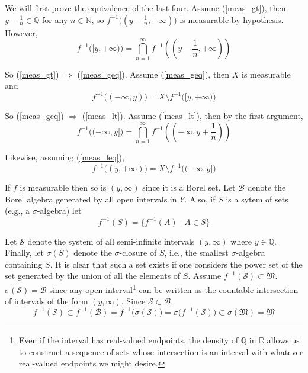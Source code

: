 \documentclass[11pt]{article}
\newcommand{\R}{\mathbb{R}}
\newcommand{\Q}{\mathbb{Q}}
\newcommand{\N}{\mathbb{N}}
\begin{document}
\begin{enumerate}
We will first prove the equivalence of the last four.  Assume (\ref{meas_gt}), then $y - \frac{1}{n} \in \Q$ for any $n \in \N$, so $f^{-1}\big((y - \frac{1}{n},+\infty)\big)$ is measurable by hypothesis.  However,
\[
f^{-1}\big([y,+\infty)\big) = \bigcap_{n=1}^\infty f^{-1}\left(\left(y - \frac{1}{n},+\infty\right)\right)
\]

So (\ref{meas_gt}) $\Rightarrow$ (\ref{meas_geq}).  Assume (\ref{meas_geq}), then $X$ is measurable and
\[
f^{-1}\big((-\infty,y)\big) = X \setminus f^{-1}\big([y,+\infty)\big)
\]

So (\ref{meas_geq}) $\Rightarrow$ (\ref{meas_lt}).  Assume (\ref{meas_lt}), then by the first argument,
\[
f^{-1}\big((-\infty,y]\big) = \bigcap_{n=1}^\infty f^{-1}\left(\left(-\infty,y+\frac{1}{n}\right)\right)
\]

Likewise, assuming (\ref{meas_leq}),
\[
f^{-1}\big((y,+\infty)\big) = X \setminus f^{-1}\big((-\infty,y]\big)
\]

If $f$ is measurable then so is $(y, \infty)$ since it is a Borel set.  Let $\mathcal{B}$ denote the Borel algebra generated by all open intervals in $Y$.  Also, if $S$ is a sytem of sets (e.g., a $\sigma$-algebra) let
\[
f^{-1}(S) = \{f^{-1}(A) \mid A \in S\}
\]

Let $\mathcal{S}$ denote the system of all semi-infinite intervals $(y,\infty)$ where $y \in \Q$.  Finally, let $\sigma(S)$ denote the $\sigma$-closure of $S$, i.e., the smallest $\sigma$-algebra containing $S$.  It is clear that such a set exists if one considers the power set of the set generated by the union of all the elements of $S$.  Assume $f^{-1}(\mathcal{S}) \subset \mathfrak{M}$.  $\sigma(\mathcal{S}) = \mathcal{B}$ since any open interval\footnote{Even if  the interval has real-valued endpoints, the density of $\Q$ in $\R$ allows us to construct a sequence of sets whose intersection is an interval with whatever real-valued endpoints we might desire.} can be written as the countable intersection of intervals of the form $(y,\infty)$.  Since $\mathcal{S} \subset \mathcal{B}$,
\[
f^{-1}(\mathcal{S}) \subset f^{-1}(\mathcal{B}) = f^{-1}\big(\sigma(\mathcal{S})\big) = \sigma\big(f^{-1}(\mathcal{S})\big) \subset \sigma(\mathfrak{M}) = \mathfrak{M}
\] 
\end{enumerate}
\end{document}
